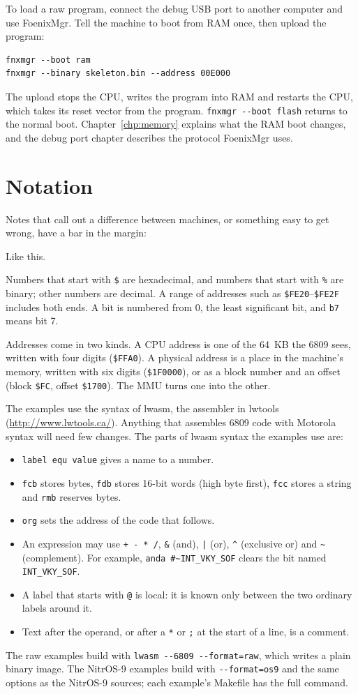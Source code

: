 To load a raw program, connect the debug USB port to another computer and use FoenixMgr. Tell the machine to boot from RAM once, then upload the program:

\begin{verbatim}
fnxmgr --boot ram
fnxmgr --binary skeleton.bin --address 00E000
\end{verbatim}

The upload stops the CPU, writes the program into RAM and restarts the CPU, which takes its reset vector from the program. \verb+fnxmgr --boot flash+ returns to the normal boot. Chapter~\ref{chp:memory} explains what the RAM boot changes, and the debug port chapter describes the protocol FoenixMgr uses.

\section{Notation}

Notes that call out a difference between machines, or something easy to get wrong, have a bar in the margin:

\begin{note}
    Like this.
\end{note}

Numbers that start with \verb+$+ are hexadecimal, and numbers that start with \verb+%+ are binary; other numbers are decimal. A range of addresses such as \verb+$FE20+--\verb+$FE2F+ includes both ends. A bit is numbered from 0, the least significant bit, and \verb+b7+ means bit 7.

Addresses come in two kinds. A CPU address is one of the 64~KB the 6809 sees, written with four digits (\verb+$FFA0+). A physical address is a place in the machine's memory, written with six digits (\verb+$1F0000+), or as a block number and an offset (block \verb+$FC+, offset \verb+$1700+). The MMU turns one into the other.

The examples use the syntax of lwasm, the assembler in lwtools (\url{http://www.lwtools.ca/}). Anything that assembles 6809 code with Motorola syntax will need few changes. The parts of lwasm syntax the examples use are:

\begin{itemize}
    \item \verb+label equ value+ gives a name to a number.
    \item \verb+fcb+ stores bytes, \verb+fdb+ stores 16-bit words (high byte first), \verb+fcc+ stores a string and \verb+rmb+ reserves bytes.
    \item \verb+org+ sets the address of the code that follows.
    \item An expression may use \verb|+ - * /|, \verb+&+ (and), \verb+|+ (or), \verb+^+ (exclusive or) and \verb+~+ (complement). For example, \verb+anda #~INT_VKY_SOF+ clears the bit named \verb+INT_VKY_SOF+.
    \item A label that starts with \verb+@+ is local: it is known only between the two ordinary labels around it.
    \item Text after the operand, or after a \verb+*+ or \verb+;+ at the start of a line, is a comment.
\end{itemize}

The raw examples build with \verb+lwasm --6809 --format=raw+, which writes a plain binary image. The NitrOS-9 examples build with \verb+--format=os9+ and the same options as the NitrOS-9 sources; each example's Makefile has the full command.
